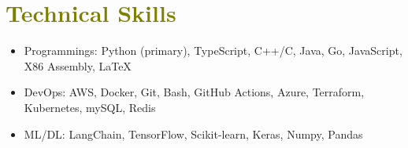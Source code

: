 
\section{\textcolor{olive}{\textbf{Technical Skills}}}

    \vspace{1.0mm}

    \begin{itemize}[
        leftmargin=0.20in, 
        label={-}, 
        itemsep=-2pt, 
        topsep=0pt,
        rightmargin=0.10in
    ]
        \item Programmings: Python (primary), TypeScript, C++/C, Java, Go, JavaScript, X86 Assembly, \LaTeX
        \item DevOps: AWS, Docker, Git, Bash, GitHub Actions, Azure, Terraform, Kubernetes, mySQL, Redis
        \item ML/DL: LangChain, TensorFlow, Scikit-learn, Keras, Numpy, Pandas
    \end{itemize}
